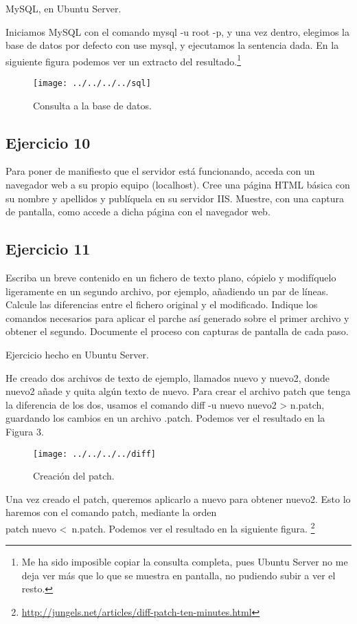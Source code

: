 \documentclass[a4paper, 11pt]{article} %
\begin{document}
MySQL, en Ubuntu Server. 

Iniciamos MySQL con el comando mysql -u root -p, y una vez dentro, elegimos la base de datos por defecto con use mysql, y ejecutamos la sentencia dada. En la siguiente figura podemos ver un extracto del resultado.\footnote{Me ha sido imposible copiar la consulta completa, pues Ubuntu Server no me deja ver más que lo que se muestra en pantalla, no pudiendo subir a ver el resto.}

\begin{figure}[htpb]
\texttt{[image: ../../../../sql]}
\caption{Consulta a la base de datos. }
\end{figure}


\subsection{Ejercicio 10}
Para poner de manifiesto que el servidor está funcionando, acceda con un navegador web a su propio equipo (localhost). Cree una página HTML básica con su nombre y apellidos y publíquela en su servidor IIS. Muestre, con una captura de pantalla, como accede a dicha página con el navegador web.


\subsection{Ejercicio 11}
Escriba un breve contenido en un fichero de texto plano, cópielo y modifíquelo ligeramente en un segundo archivo, por ejemplo, añadiendo un par de líneas. Calcule las diferencias entre el fichero original y el modificado. Indique los comandos necesarios para aplicar el parche así generado sobre el primer archivo y obtener el segundo. Documente el proceso con capturas de pantalla de cada paso.

Ejercicio hecho en Ubuntu Server. 

He creado dos archivos de texto de ejemplo, llamados nuevo y nuevo2, donde nuevo2 añade y quita algún texto de nuevo. Para crear el archivo patch que tenga la diferencia de los dos, usamos el comando diff -u nuevo nuevo2 > n.patch, guardando los cambios en un archivo .patch. Podemos ver el resultado en la Figura 3. 

\begin{figure}[htpb]
\texttt{[image: ../../../../diff]}
\caption{Creación del patch.}
\end{figure}

\pagebreak

Una vez creado el patch, queremos aplicarlo a nuevo para obtener nuevo2. Esto lo haremos con el comando patch, mediante la orden\\ patch nuevo <\ n.patch. Podemos ver el resultado en la siguiente figura. \footnote{\url{http://jungels.net/articles/diff-patch-ten-minutes.html}}
\end{document}
